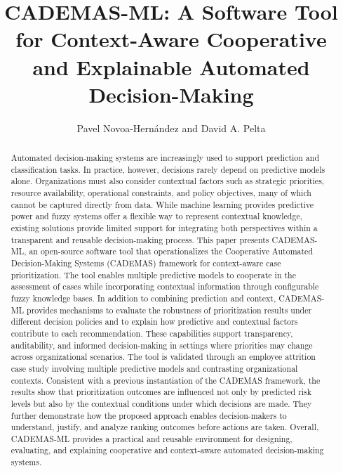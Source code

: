 \documentclass[]{article}
\title{CADEMAS-ML: A Software Tool for Context-Aware Cooperative and Explainable Automated Decision-Making}
\author{Pavel Novoa-Hernández and David A. Pelta}
\begin{document}
 

\maketitle


\begin{abstract}Automated decision-making systems are increasingly used to support prediction and classification tasks. In practice, however, decisions rarely depend on predictive models alone. Organizations must also consider contextual factors such as strategic priorities, resource availability, operational constraints, and policy objectives, many of which cannot be captured directly from data. While machine learning provides predictive power and fuzzy systems offer a flexible way to represent contextual knowledge, existing solutions provide limited support for integrating both perspectives within a transparent and reusable decision-making process.
This paper presents CADEMAS-ML, an open-source software tool that operationalizes the Cooperative Automated Decision-Making Systems (CADEMAS) framework for context-aware case prioritization. The tool enables multiple predictive models to cooperate in the assessment of cases while incorporating contextual information through configurable fuzzy knowledge bases. In addition to combining prediction and context, CADEMAS-ML provides mechanisms to evaluate the robustness of prioritization results under different decision policies and to explain how predictive and contextual factors contribute to each recommendation. These capabilities support transparency, auditability, and informed decision-making in settings where priorities may change across organizational scenarios.
The tool is validated through an employee attrition case study involving multiple predictive models and contrasting organizational contexts. Consistent with a previous instantiation of the CADEMAS framework, the results show that prioritization outcomes are influenced not only by predicted risk levels but also by the contextual conditions under which decisions are made. They further demonstrate how the proposed approach enables decision-makers to understand, justify, and analyze ranking outcomes before actions are taken. Overall, CADEMAS-ML provides a practical and reusable environment for designing, evaluating, and explaining cooperative and context-aware automated decision-making systems.
\end{abstract}
\end{document}
